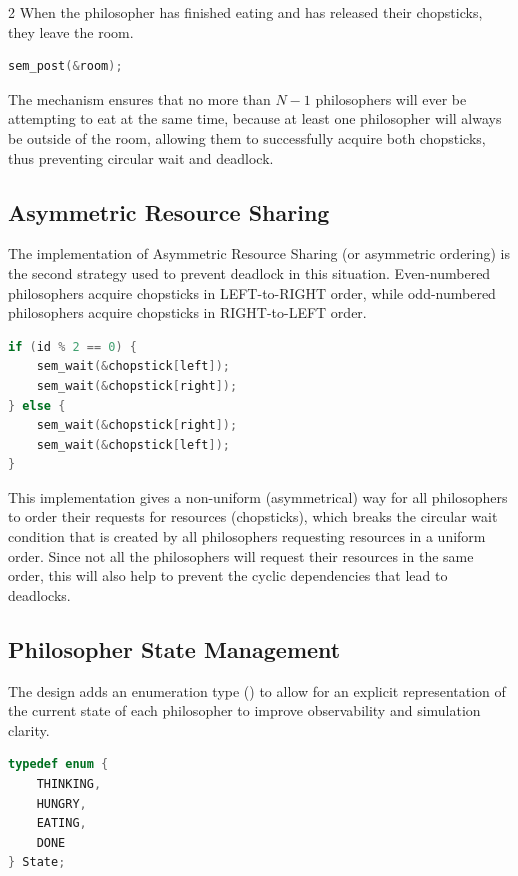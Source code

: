 \documentclass[11pt,a4paper]{article}
\newcommand{\code}[1]{\tcbox[on line, boxsep=1pt, left=1pt, right=1pt, top=1pt, bottom=1pt, colback=inlinegray, colframe=inlinegray, fontupper=\ttfamily\small]{#1}}
\begin{document}
\begin{multicols*}{2}
When the philosopher has finished eating and has released their chopsticks, they leave the room.

\begin{lstlisting}[language=C, caption=Leaving the Room]
sem_post(&room);
\end{lstlisting}

The mechanism ensures that no more than $N-1$ philosophers will ever be attempting to eat at the same time, because at least one philosopher will always be outside of the room, allowing them to successfully acquire both chopsticks, thus preventing circular wait and deadlock.

\subsection{Asymmetric Resource Sharing}
The implementation of Asymmetric Resource Sharing (or asymmetric ordering) is the second strategy used to prevent deadlock in this situation. Even-numbered philosophers acquire chopsticks in LEFT-to-RIGHT order, while odd-numbered philosophers acquire chopsticks in RIGHT-to-LEFT order.

\begin{lstlisting}[language=C, caption=Asymmetric Chopstick Acquisition]
if (id % 2 == 0) {
    sem_wait(&chopstick[left]);
    sem_wait(&chopstick[right]);
} else {
    sem_wait(&chopstick[right]);
    sem_wait(&chopstick[left]);
}
\end{lstlisting}

This implementation gives a non-uniform (asymmetrical) way for all philosophers to order their requests for resources (chopsticks), which breaks the circular wait condition that is created by all philosophers requesting resources in a uniform order. Since not all the philosophers will request their resources in the same order, this will also help to prevent the cyclic dependencies that lead to deadlocks.

\subsection{Philosopher State Management}
The design adds an enumeration type (\code{enum}) to allow for an explicit representation of the current state of each philosopher to improve observability and simulation clarity.

\begin{lstlisting}[language=C, caption=State Enumeration]
typedef enum {
    THINKING,
    HUNGRY,
    EATING,
    DONE
} State;
\end{lstlisting}


\end{multicols*}
\end{document}
